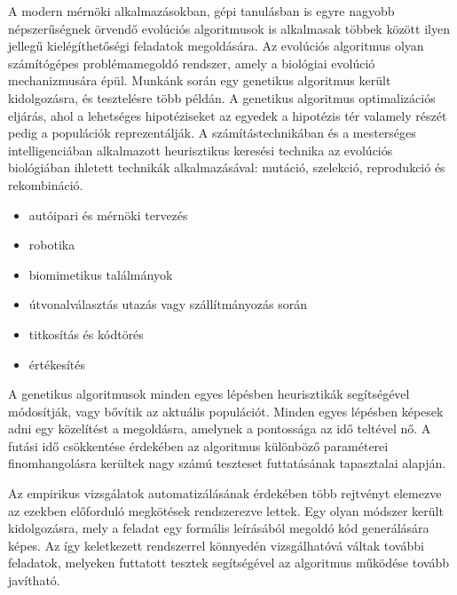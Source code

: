 \documentclass[12ppt,a4paper,oneside]{report}
\begin{document}
	A modern mérnöki alkalmazásokban, gépi tanulásban is egyre nagyobb népszerűségnek örvendő evolúciós algoritmusok is alkalmasak többek között ilyen jellegű kielégíthetőségi feladatok megoldására.
    Az evolúciós algoritmus olyan számítógépes problémamegoldó rendszer, amely a biológiai evolúció mechanizmusára épül.
    Munkánk során egy genetikus algoritmus került kidolgozásra, és tesztelésre több példán.
    A genetikus algoritmus optimalizációs eljárás, ahol a lehetséges hipotéziseket az egyedek a hipotézis tér valamely részét pedig a populációk reprezentálják.
    A számítástechnikában és a mesterséges intelligenciában alkalmazott heurisztikus keresési technika az evolúciós biológiában ihletett technikák alkalmazásával: mutáció, szelekció, reprodukció és rekombináció.


	\begin{itemize}
        \item autóipari és mérnöki tervezés
        \item robotika
        \item biomimetikus találmányok
        \item útvonalválasztás utazás vagy szállítmányozás során
        \item titkosítás és kódtörés
        \item értékesítés
	\end{itemize}

	A genetikus algoritmusok minden egyes lépésben heurisztikák segítségével módosítják, vagy bővítik az aktuális populációt.
    Minden egyes lépésben képesek adni egy közelítést a megoldásra, amelynek a pontossága az idő teltével nő.
    A futási idő csökkentése érdekében az algoritmus különböző paraméterei finomhangolásra kerültek nagy számú teszteset futtatásának tapasztalai alapján.

	Az empirikus vizsgálatok automatizálásának érdekében több rejtvényt elemezve az ezekben előforduló megkötések rendszerezve lettek.
    Egy olyan módszer került kidolgozásra, mely a feladat egy formális leírásából megoldó kód generálására képes.
    Az így keletkezett rendszerrel könnyedén vizsgálhatóvá váltak további feladatok, melyeken futtatott tesztek segítségével az algoritmus működése tovább javítható.
\end{document}
